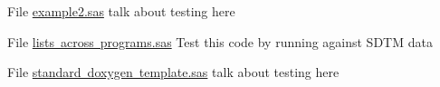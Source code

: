 
\begin{DoxyRefList}
\item[File \mbox{\hyperlink{example2_8sas}{example2.sas}} ]\label{test__test000001}%
%
talk about testing here 


\item[File \mbox{\hyperlink{lists_01across_01programs_8sas}{lists across programs.sas}} ]\label{test__test000002}%
%
Test this code by running against SDTM data 
\item[File \mbox{\hyperlink{standard_01doxygen_01template_8sas}{standard doxygen template.sas}} ]\label{test__test000003}%
%
talk about testing here 


\end{DoxyRefList}